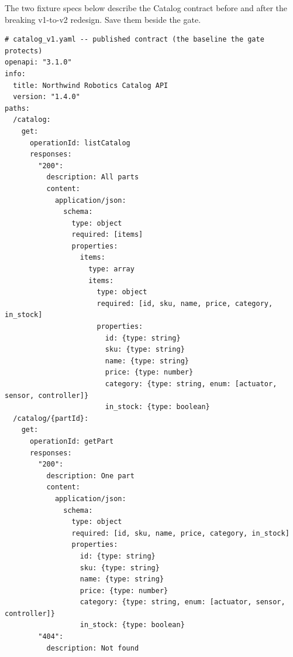 The two fixture specs below describe the Catalog contract before and after
the breaking v1-to-v2 redesign. Save them beside the gate.

\begin{verbatim}
# catalog_v1.yaml -- published contract (the baseline the gate protects)
openapi: "3.1.0"
info:
  title: Northwind Robotics Catalog API
  version: "1.4.0"
paths:
  /catalog:
    get:
      operationId: listCatalog
      responses:
        "200":
          description: All parts
          content:
            application/json:
              schema:
                type: object
                required: [items]
                properties:
                  items:
                    type: array
                    items:
                      type: object
                      required: [id, sku, name, price, category, in_stock]
                      properties:
                        id: {type: string}
                        sku: {type: string}
                        name: {type: string}
                        price: {type: number}
                        category: {type: string, enum: [actuator, sensor, controller]}
                        in_stock: {type: boolean}
  /catalog/{partId}:
    get:
      operationId: getPart
      responses:
        "200":
          description: One part
          content:
            application/json:
              schema:
                type: object
                required: [id, sku, name, price, category, in_stock]
                properties:
                  id: {type: string}
                  sku: {type: string}
                  name: {type: string}
                  price: {type: number}
                  category: {type: string, enum: [actuator, sensor, controller]}
                  in_stock: {type: boolean}
        "404":
          description: Not found
\end{verbatim}

